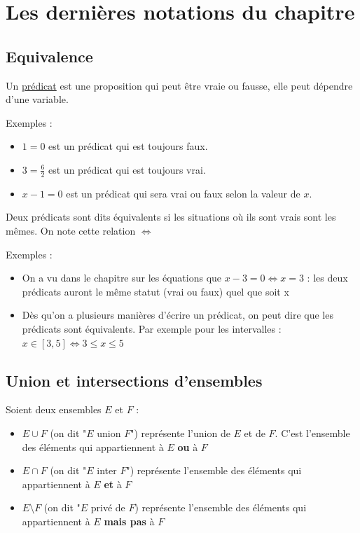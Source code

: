 \documentclass[10pt,a4paper]{book}
\begin{document}
\section{Les dernières notations du chapitre}

\subsection{Equivalence}

Un \underline{prédicat} est une proposition qui peut être vraie ou fausse, elle peut dépendre d'une variable. 

Exemples :
\begin{itemize}
    \item $1=0$ est un prédicat qui est toujours faux.
    \item $3 = \frac{6}{2}$ est un prédicat qui est toujours vrai.
    \item $x - 1 = 0$ est un prédicat qui sera vrai ou faux selon la valeur de $x$.
\end{itemize}

\begin{de}
    Deux prédicats sont dits équivalents si les situations où ils sont vrais sont les mêmes. On note cette relation $\Leftrightarrow$
\end{de}

Exemples :
\begin{itemize}
    \item On a vu dans le chapitre sur les équations que $x-3 = 0 \Leftrightarrow x = 3$ : les deux prédicats auront le même statut (vrai ou faux) quel que soit x
    \item Dès qu'on a plusieurs manières d'écrire un prédicat, on peut dire que les prédicats sont équivalents. Par exemple pour les intervalles : $x \in [3,5] \Leftrightarrow  3 \leq x \leq 5$
\end{itemize}

\subsection{Union et intersections d'ensembles}

\begin{de}
    Soient deux ensembles $E$ et $F$ :
    \begin{itemize}
        \item $E \cup F$ (on dit "$E$ union $F$") représente l'union de $E$ et de $F$. C'est l'ensemble des éléments qui appartiennent à $E$ \textbf{ou} à $F$
        \item $E \cap F$ (on dit "$E$ inter $F$") représente l'ensemble des éléments qui appartiennent à $E$ \textbf{et} à $F$
        \item $E \setminus F$ (on dit "$E$ privé de $F$) représente l'ensemble des éléments qui appartiennent à $E$ \textbf{mais pas} à $F$
    \end{itemize}
\end{de}
\end{document}

